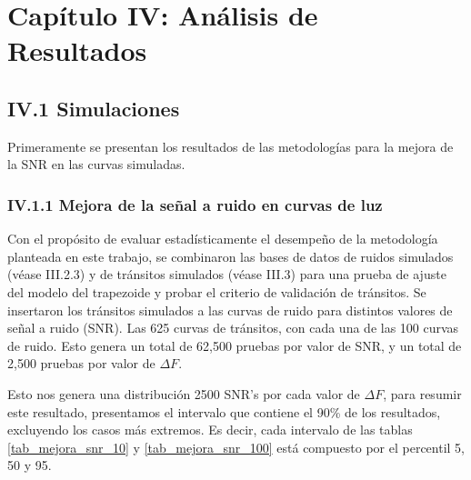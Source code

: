 \chapter*{\textbf{Capítulo IV: Análisis de Resultados}}
\label{ch:Resultados}
\setcounter{chapter}{4}
\setcounter{equation}{0}
\setcounter{figure}{0}
\setcounter{table}{0}

\section*{IV.1 Simulaciones}

Primeramente se presentan los resultados de las metodologías para la mejora de la SNR en las curvas simuladas.

\subsection*{IV.1.1 Mejora de la señal a ruido en curvas de luz}

Con el propósito de evaluar estadísticamente el desempeño de la metodología planteada en este trabajo, se combinaron las bases de datos de ruidos simulados (véase III.2.3) y de tránsitos simulados (véase III.3) para una prueba de ajuste del modelo del trapezoide y probar el criterio de validación de tránsitos. Se insertaron los tránsitos simulados a las curvas de ruido para distintos valores de señal a ruido (SNR). Las 625 curvas de tránsitos, con cada una de las 100 curvas de ruido. Esto genera un total de 62,500 pruebas por valor de SNR, y un total de 2,500 pruebas por valor de $\Delta F$.

Esto nos genera una distribución 2500 SNR's por cada valor de $\Delta F$, para resumir este resultado, presentamos el intervalo que contiene el 90\% de los resultados, excluyendo los casos más extremos. Es decir, cada intervalo de las tablas \ref{tab_mejora_snr_10} y \ref{tab_mejora_snr_100} está compuesto por el percentil 5, 50 y 95.  

